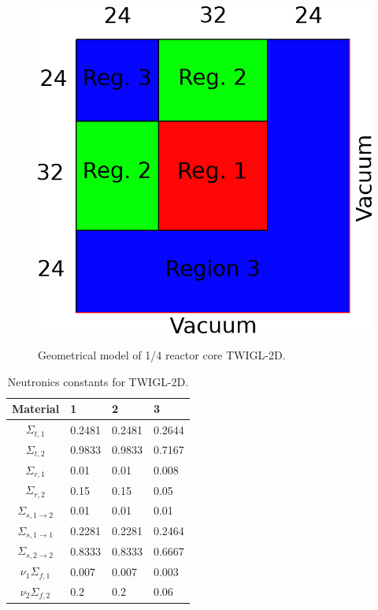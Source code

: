 \documentclass[preprint]{elsarticle}
\begin{document}
\begin{figure}[ht]
\begin{center}
	\includegraphics[width=0.5\linewidth]{twigl/twigl_geo.png} \\
	\caption{\label{image:canonsummary}Geometrical model of 1/4 reactor core TWIGL-2D.}
	\label{twigl}
\end{center}
\end{figure}

\begin{table}[ht]
\caption{\label{table:coeff}Neutronics constants for TWIGL-2D.}
	\label{twigl_const}
	\begin{center}
	\begin{tabular}{| c | l | l | l |}
		\hline
		Material & 1 & 2 & 3\\
		\hline 
		$\Sigma_{t,1}$				& 0.2481 & 0.2481 & 0.2644 \\
		$\Sigma_{t,2}$				& 0.9833 & 0.9833 & 0.7167 \\
		$\Sigma_{r,1}$				& 0.01   & 0.01   & 0.008  \\
		$\Sigma_{r,2}$				& 0.15   & 0.15   & 0.05   \\	
		$\Sigma_{s,1\rightarrow2}$ 	& 0.01   & 0.01   & 0.01   \\
		$\Sigma_{s,1\rightarrow1}$	& 0.2281 & 0.2281 & 0.2464 \\
		$\Sigma_{s,2\rightarrow2}$	& 0.8333 & 0.8333 & 0.6667 \\
		$\nu_1\Sigma_{f,1}$			& 0.007  & 0.007  & 0.003  \\
		$\nu_2\Sigma_{f,2}$			& 0.2    & 0.2    & 0.06   \\
		\hline
	\end{tabular}
	\end{center}
\end{table}
\end{document}
